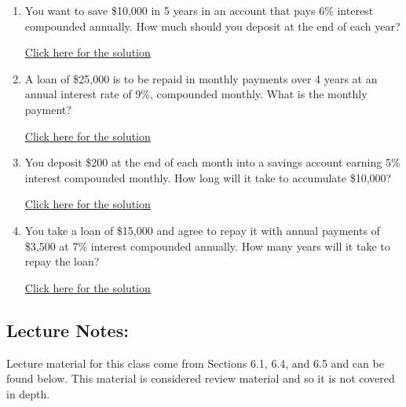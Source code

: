 \documentclass[
]{book}
\providecommand{\tightlist}{%
  \setlength{\itemsep}{0pt}\setlength{\parskip}{0pt}}
\begin{document}
\begin{enumerate}
\def\labelenumi{\arabic{enumi}.}
\tightlist
\item
  You want to save \$10,000 in 5 years in an account that pays 6\% interest compounded annually. How much should you deposit at the end of each year?

  \href{https://youtu.be/eyVyq_2Wgu4}{Click here for the solution}
\item
  A loan of \$25,000 is to be repaid in monthly payments over 4 years at an annual interest rate of 9\%, compounded monthly. What is the monthly payment?

  \href{https://youtu.be/wbn7X2z9JGM}{Click here for the solution}
\item
  You deposit \$200 at the end of each month into a savings account earning 5\% interest compounded monthly. How long will it take to accumulate \$10,000?

  \href{https://youtu.be/Vbx8oxYbk-A}{Click here for the solution}
\item
  You take a loan of \$15,000 and agree to repay it with annual payments of \$3,500 at 7\% interest compounded annually. How many years will it take to repay the loan?

  \href{https://youtu.be/XDfm1eRTefE}{Click here for the solution}
\end{enumerate}

\subsection*{Lecture Notes:}\label{lecture-notes-14}

Lecture material for this class come from Sections 6.1, 6.4, and 6.5 and can be found below. This material is considered review material and so it is not covered in depth.
\end{document}
